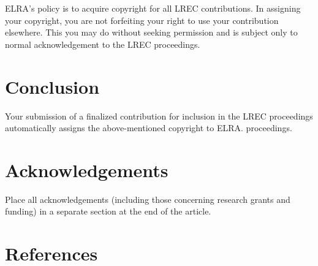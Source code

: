 \documentclass[10pt, a4paper]{article}
\begin{document}
ELRA's policy is to acquire copyright for all LREC contributions. In assigning your copyright, you are not forfeiting your right to use your contribution elsewhere. This you may do without seeking permission and is subject only to normal acknowledgement to the LREC proceedings.

\section{Conclusion}

Your submission of a finalized contribution for inclusion in the LREC proceedings automatically assigns the above-mentioned copyright to ELRA.
proceedings.

\section{Acknowledgements}

Place all acknowledgements (including those concerning research grants and funding) in a separate section at the end of the article.

\section{References}




\end{document}
